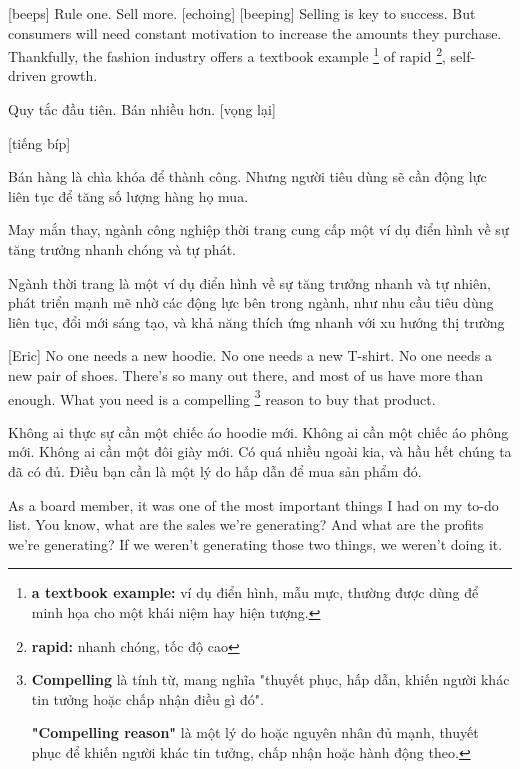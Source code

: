 \documentclass[a4paper]{article}
\begin{document}
	[beeps]
	Rule one.
	Sell more. [echoing]
	[beeping]
	Selling is key to success. But consumers will need constant motivation to increase the amounts they purchase.
	Thankfully, the fashion industry offers a textbook example \footnote{
		\textbf{a textbook example:} ví dụ điển hình, mẫu mực, thường được dùng để minh họa cho một khái niệm hay hiện tượng.
	
	} of rapid \footnote{
		\textbf{rapid:} nhanh chóng, tốc độ cao
	
	}, self-driven growth.
	
	\begin{vietnamese-v2}
		
		Quy tắc đầu tiên. Bán nhiều hơn. [vọng lại]
			
		[tiếng bíp]
		
		Bán hàng là chìa khóa để thành công. Nhưng người tiêu dùng sẽ cần động lực liên tục để tăng số lượng hàng họ mua.
		
		May mắn thay, ngành công nghiệp thời trang cung cấp một ví dụ điển hình về sự tăng trưởng nhanh chóng và tự phát.
		
		Ngành thời trang là một ví dụ điển hình về sự tăng trưởng nhanh và tự nhiên, phát triển mạnh mẽ nhờ các động lực bên trong ngành, như nhu cầu tiêu dùng liên tục, đổi mới sáng tạo, và khả năng thích ứng nhanh với xu hướng thị trường
	\end{vietnamese-v2}
	
	
	[Eric] No one needs a new hoodie. No one needs a new T-shirt. No one needs a new pair of shoes. There's so many out there, and most of us have more than enough. What you need is a compelling  \footnote{
		\textbf{Compelling} là tính từ, mang nghĩa "thuyết phục, hấp dẫn, khiến người khác tin tưởng hoặc chấp nhận điều gì đó".
	
		\textbf{"Compelling reason"} là một lý do hoặc nguyên nhân đủ mạnh, thuyết phục để khiến người khác tin tưởng, chấp nhận hoặc hành động theo.
	} reason to buy that product.
	
	\begin{vietnamese-v2}
		[Eric] Không ai thực sự cần một chiếc áo hoodie mới. Không ai cần một chiếc áo phông mới. Không ai cần một đôi giày mới. Có quá nhiều ngoài kia, và hầu hết chúng ta đã có đủ. Điều bạn cần là một lý do hấp dẫn để mua sản phẩm đó.
	\end{vietnamese-v2}
	
	As a board member, it was one of the most important things I had on my to-do list.
	You know, what are the sales we're generating?
	And what are the profits we're generating?
	If we weren't generating those two things, we weren't doing it.
	
\end{document}
